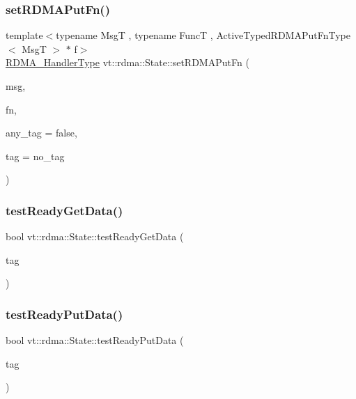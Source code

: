 \subsubsection{\texorpdfstring{set\+R\+D\+M\+A\+Put\+Fn()}{setRDMAPutFn()}}
{\footnotesize\ttfamily template$<$typename MsgT , typename FuncT , Active\+Typed\+R\+D\+M\+A\+Put\+Fn\+Type$<$ Msg\+T $>$ $\ast$ f$>$ \\
\hyperlink{namespacevt_a9530efb893c0f3846e8ac5f0507e0f49}{R\+D\+M\+A\+\_\+\+Handler\+Type} vt\+::rdma\+::\+State\+::set\+R\+D\+M\+A\+Put\+Fn (\begin{DoxyParamCaption}\item[{MsgT $\ast$}]{msg,  }\item[{FuncT const \&}]{fn,  }\item[{bool const \&}]{any\+\_\+tag = {\ttfamily false},  }\item[{\hyperlink{namespacevt_a84ab281dae04a52a4b243d6bf62d0e52}{Tag\+Type} const \&}]{tag = {\ttfamily no\+\_\+tag} }\end{DoxyParamCaption})}

\mbox{\label{structvt_1_1rdma_1_1_state_aca75303aab9cc0650fd774048e59239e}} 
\subsubsection{\texorpdfstring{test\+Ready\+Get\+Data()}{testReadyGetData()}}
{\footnotesize\ttfamily bool vt\+::rdma\+::\+State\+::test\+Ready\+Get\+Data (\begin{DoxyParamCaption}\item[{\hyperlink{namespacevt_a84ab281dae04a52a4b243d6bf62d0e52}{Tag\+Type} const \&}]{tag }\end{DoxyParamCaption})}

\mbox{\label{structvt_1_1rdma_1_1_state_a4fc0ac910f62594cc74a82646b9b1d88}} 
\subsubsection{\texorpdfstring{test\+Ready\+Put\+Data()}{testReadyPutData()}}
{\footnotesize\ttfamily bool vt\+::rdma\+::\+State\+::test\+Ready\+Put\+Data (\begin{DoxyParamCaption}\item[{\hyperlink{namespacevt_a84ab281dae04a52a4b243d6bf62d0e52}{Tag\+Type} const \&}]{tag }\end{DoxyParamCaption})}

